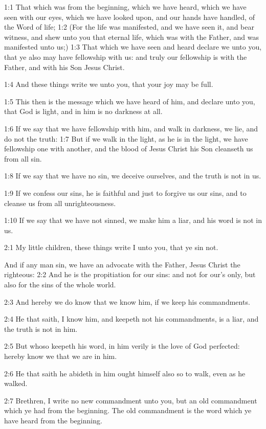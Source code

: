 

1:1 That which was from the beginning, which we have heard, which we have seen with our eyes, which we have looked upon, and our hands have handled, of the Word of life; 1:2 (For the life was manifested, and we have seen it, and bear witness, and shew unto you that eternal life, which was with the Father, and was manifested unto us;) 1:3 That which we have seen and heard declare we unto you, that ye also may have fellowship with us: and truly our fellowship is with the Father, and with his Son Jesus Christ.

1:4 And these things write we unto you, that your joy may be full.

1:5 This then is the message which we have heard of him, and declare unto you, that God is light, and in him is no darkness at all.

1:6 If we say that we have fellowship with him, and walk in darkness, we lie, and do not the truth: 1:7 But if we walk in the light, as he is in the light, we have fellowship one with another, and the blood of Jesus Christ his Son cleanseth us from all sin.

1:8 If we say that we have no sin, we deceive ourselves, and the truth is not in us.

1:9 If we confess our sins, he is faithful and just to forgive us our sins, and to cleanse us from all unrighteousness.

1:10 If we say that we have not sinned, we make him a liar, and his word is not in us.

2:1 My little children, these things write I unto you, that ye sin not.

And if any man sin, we have an advocate with the Father, Jesus Christ the righteous: 2:2 And he is the propitiation for our sins: and not for our's only, but also for the sins of the whole world.

2:3 And hereby we do know that we know him, if we keep his commandments.

2:4 He that saith, I know him, and keepeth not his commandments, is a liar, and the truth is not in him.

2:5 But whoso keepeth his word, in him verily is the love of God perfected: hereby know we that we are in him.

2:6 He that saith he abideth in him ought himself also so to walk, even as he walked.

2:7 Brethren, I write no new commandment unto you, but an old commandment which ye had from the beginning. The old commandment is the word which ye have heard from the beginning.

